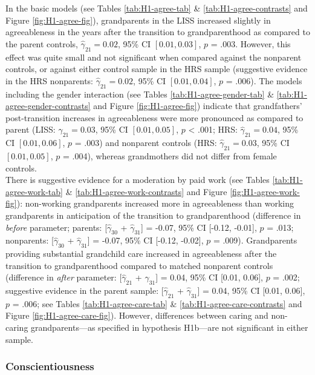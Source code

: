 \documentclass[
  english,
  man, noextraspace]{apa7}
\begin{document}
In the basic models (see Tables \ref{tab:H1-agree-tab} \& \ref{tab:H1-agree-contrasts} and Figure \ref{fig:H1-agree-fig}), grandparents in the LISS increased slightly in agreeableness in the years after the transition to grandparenthood as compared to the parent controls, \(\hat{\gamma}_{21} = 0.02\), 95\% CI \([0.01, 0.03]\), \(p\) = .003. However, this effect was quite small and not significant when compared against the nonparent controls, or against either control sample in the HRS sample (suggestive evidence in the HRS nonparents: \(\hat{\gamma}_{21} = 0.02\), 95\% CI \([0.01, 0.04]\), \(p\) = .006). The models including the gender interaction (see Tables \ref{tab:H1-agree-gender-tab} \& \ref{tab:H1-agree-gender-contrasts} and Figure \ref{fig:H1-agree-fig}) indicate that grandfathers' post-transition increases in agreeableness were more pronounced as compared to parent (LISS: \(\hat{\gamma}_{21} = 0.03\), 95\% CI \([0.01, 0.05]\), \(p\) \textless{} .001; HRS: \(\hat{\gamma}_{21} = 0.04\), 95\% CI \([0.01, 0.06]\), \(p\) = .003) and nonparent controls (HRS: \(\hat{\gamma}_{21} = 0.03\), 95\% CI \([0.01, 0.05]\), \(p\) = .004), whereas grandmothers did not differ from female controls.\\
There is suggestive evidence for a moderation by paid work (see Tables \ref{tab:H1-agree-work-tab} \& \ref{tab:H1-agree-work-contrasts} and Figure \ref{fig:H1-agree-work-fig}): non-working grandparents increased more in agreeableness than working grandparents in anticipation of the transition to grandparenthood (difference in \emph{before} parameter; parents: {[}\(\hat{\gamma}_{30}\) + \(\hat{\gamma}_{31}\){]} = -0.07, 95\% CI {[}-0.12, -0.01{]}, \(p\) = .013; nonparents: {[}\(\hat{\gamma}_{30}\) + \(\hat{\gamma}_{31}\){]} = -0.07, 95\% CI {[}-0.12, -0.02{]}, \(p\) = .009). Grandparents providing substantial grandchild care increased in agreeableness after the transition to grandparenthood compared to matched nonparent controls (difference in \emph{after} parameter: {[}\(\hat{\gamma}_{21}\) + \(\hat{\gamma}_{31}\){]} = 0.04, 95\% CI {[}0.01, 0.06{]}, \(p\) = .002; suggestive evidence in the parent sample: {[}\(\hat{\gamma}_{21}\) + \(\hat{\gamma}_{31}\){]} = 0.04, 95\% CI {[}0.01, 0.06{]}, \(p\) = .006; see Tables \ref{tab:H1-agree-care-tab} \& \ref{tab:H1-agree-care-contrasts} and Figure \ref{fig:H1-agree-care-fig}). However, differences between caring and non-caring grandparents---as specified in hypothesis H1b---are not significant in either sample.

\hypertarget{conscientiousness}{%
\subsubsection{Conscientiousness}\label{conscientiousness}}
\end{document}
